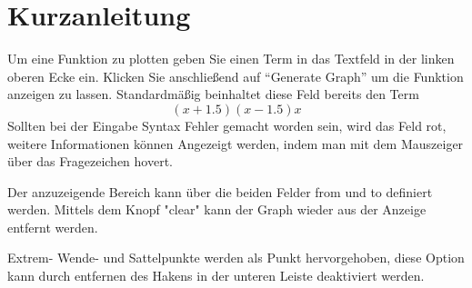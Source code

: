 \documentclass[12pt]{article}
\begin{document}
	\section*{Kurzanleitung}

	Um eine Funktion zu plotten geben Sie einen Term in das Textfeld in der linken oberen Ecke ein. Klicken Sie
	anschließend auf ``Generate Graph'' um die Funktion anzeigen zu lassen. Standardmäßig beinhaltet diese Feld
	bereits den Term 
	\[
		(x+1.5)(x-1.5)x
	\]
	Sollten bei der Eingabe Syntax Fehler gemacht worden sein, wird das Feld rot, weitere Informationen können Angezeigt werden, indem man mit dem Mauszeiger 
	über das Fragezeichen hovert.

	Der anzuzeigende Bereich kann über die beiden Felder from und to definiert werden.
	Mittels dem Knopf "clear" kann der Graph wieder aus der Anzeige entfernt werden.

	Extrem- Wende- und Sattelpunkte werden als Punkt hervorgehoben, diese Option kann durch entfernen des Hakens in der unteren Leiste deaktiviert werden.
\end{document}
